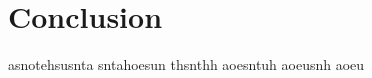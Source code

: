 
\begingroup

\let\clearpage\relax
\let\cleardoublepage\relax
\let\cleardoublepage\relax

\chapter*{Conclusion} %
asnotehsusnta sntahoesun thsnthh aoesntuh aoeusnh aoeu

\endgroup